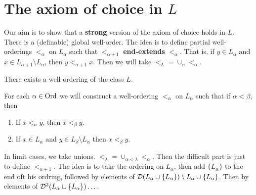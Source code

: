 \documentclass{article}
\begin{document}
\section{The axiom of choice in $L$}
Our aim is to show that a \textbf{strong} version of the axiom of choice holds in $L$. There is a (definable) global well-order. The idea is to define partial well-orderings $<_{\alpha}$ on $L_{\alpha}$ such that $<_{\alpha+1}$ \textbf{end-extends} $<_{\alpha}$. That is, if $y \in L_{\alpha}$ and $x \in L_{\alpha+1}\setminus L_{\alpha}$, then $y <_{\alpha+1} x$. Then we will take $<_{L} = \cup_{\alpha} <_{\alpha}$.
\begin{fancythm}{}
    There exists a well-ordering of the class $L$.
\end{fancythm}
\proof For each $\alpha \in \operatorname{Ord}$ we will construct a well-ordering $<_{\alpha}$ on $L_{\alpha}$ such that if $\alpha < \beta$, then \begin{enumerate}
    \item[(i)] If $x<_{\alpha} y$, then $x <_{\beta} y$.
    \item[(ii)] If $x \in L_{\alpha}$ and $y \in L_{\beta} \setminus L_{\alpha}$ then $x <_{\beta} y$.
\end{enumerate}
In limit cases, we take unions. $<_{\lambda} = \cup_{\alpha < \lambda} <_{\alpha}$. \gap
Then the difficult part is just to define $<_{\alpha+1}$. The idea is to take the ordering on $L_{\alpha}$, then add $\{L_{\alpha}\}$ to the end oft his ordring, followed by elements of $\mathcal{D}(L_{\alpha} \cup \{L_{\alpha}\}) \setminus L_{\alpha} \cup \{L_{\alpha}\}$. Then by elements of $\mathcal{D}^{2}(L_{\alpha} \cup \{L_{\alpha}\}) \dots$.\gap
\end{document}
